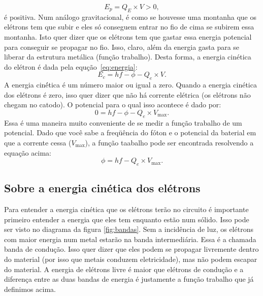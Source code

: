 \documentclass{article}
\begin{document}
\begin{equation}
E_p = Q_E\times V > 0,
\end{equation}
\'e positiva. Num an\'alogo gravitacional, \'e como se houvesse uma montanha que os el\'etrons tem que subir e eles s\'o conseguem entrar no fio de cima se subirem essa montanha. Isto quer dizer que os el\'etrons tem que gastar essa energia potencial para conseguir se propagar no fio. Isso, claro, al\'em da energia gasta para se liberar da estrutura met\'alica (fun\c c\~ao trabalho). Desta forma, a energia cin\'etica do el\'etron \'e dada pela equ\c c\~ao~\eqref{eq:energia}:
\begin{equation}
E_c = hf - \phi - Q_e\times V.
\end{equation}
A energia cin\'ética \'e um n\'umero maior ou igual a zero. Quando a energia cin\'etica dos el\'etrons \'e zero, isso quer dizer que n\~ao h\'a corrente el\'etrica (os el\'etrons n\~ao chegam no catodo). O potencial para o qual isso acontece \'e dado por:
\begin{equation}
0 = hf - \phi - Q_e\times V_{\text{max}}.
\end{equation}
Essa \'e uma maneira muito conveniente de se medir a fun\c c\~ao trabalho de um potencial. Dado que voc\^e sabe a freq\"u\^encia do f\'oton e o potencial da baterial em que a corrente cessa ($V_{\text{max}}$), a fun\c c\~ao taabalho pode ser encontrada resolvendo a equa\c c\~ao acima:
\begin{equation}
\phi = hf - Q_e\times V_{\text{max}}.
\end{equation}

\subsection{Sobre a energia cin\'etica dos el\'etrons}
Para entender a energia cin\'etica que os el\'etrons ter\~ao no circuito \'e importante primeiro entender a energia que eles tem enquanto est\~ao num s\'olido. Isso pode ser visto no diagrama da figura \ref{fig:bandas}. Sem a incid\^encia de luz, os el\'etrons com maior energia num metal estar\~ao na banda intermedi\'aria. Essa \'e a chamada banda de condu\c c\~ao. Isso quer dizer que eles podem se propagar livremente dentro do material (por isso que metais conduzem eletricidade), mas n\~ao podem escapar do material. A energia de el\'etrons livre \'e maior que el\'etrons de condu\c c\~ao e a diferen\c ca entre as duas bandas de energia \'e justamente a fun\c c\~ao trabalho que j\'a definimos acima.
\end{document}

